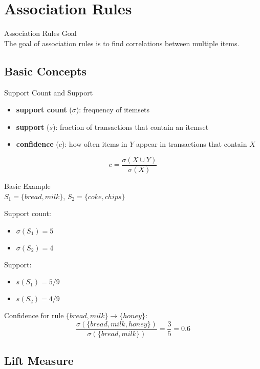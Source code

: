 \section{Association Rules}

\begin{definition}{Association Rules Goal}\\
The goal of association rules is to find correlations between multiple items.
\end{definition}

\subsection{Basic Concepts}

\begin{definition}{Support Count and Support}
\begin{itemize}
    \item \textbf{support count} ($\sigma$): frequency of itemsets
    \item \textbf{support} ($s$): fraction of transactions that contain an itemset
    \item \textbf{confidence} ($c$): how often items in $Y$ appear in transactions that contain $X$
\end{itemize}

$$c = \frac{\sigma(X \cup Y)}{\sigma(X)}$$
\end{definition}

\begin{example2}{Basic Example}\\
$S_1 = \{bread, milk\}$, $S_2 = \{coke, chips\}$

Support count:
\begin{itemize}
    \item $\sigma(S_1) = 5$
    \item $\sigma(S_2) = 4$
\end{itemize}

Support:
\begin{itemize}
    \item $s(S_1) = 5/9$
    \item $s(S_2) = 4/9$
\end{itemize}

Confidence for rule $\{bread, milk\} \rightarrow \{honey\}$:
$$\frac{\sigma(\{bread, milk, honey\})}{\sigma(\{bread, milk\})} = \frac{3}{5} = 0.6$$
\end{example2}

\subsection{Lift Measure}

